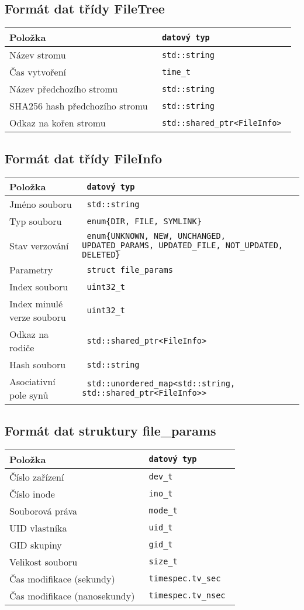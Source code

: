 \subsection{Formát dat třídy FileTree}

\begin{tabular}{l >{\tt}l}
\bf Položka & \bf datový typ \\
\hline
Název stromu & std::string \\
Čas vytvoření & time\_t \\
Název předchozího stromu & std::string \\
SHA256 hash předchozího stromu & std::string \\
Odkaz na kořen stromu & std::shared\_ptr<FileInfo> \\
\end{tabular}

\subsection{Formát dat třídy FileInfo}

\begin{tabular}{l >{\tt}p{7cm}}
\bf Položka & \bf datový typ \\
\hline
Jméno souboru & std::string \\
Typ souboru & enum\{DIR, FILE, SYMLINK\}\\
Stav verzování & enum\{UNKNOWN, NEW, UNCHANGED, UPDATED\_PARAMS, UPDATED\_FILE, NOT\_UPDATED, DELETED\} \\
Parametry & struct file\_params \\
Index souboru & uint32\_t \\
Index minulé verze souboru & uint32\_t \\
Odkaz na rodiče & std::shared\_ptr<FileInfo> \\
Hash souboru & std::string \\
Asociativní pole synů & std::unordered\_map<std::string, std::shared\_ptr<FileInfo>\relax> \\
\end{tabular}

\subsection{Formát dat struktury file\_params}

\begin{tabular}{l >{\tt}l}
\bf Položka & \bf datový typ \\
\hline
Číslo zařízení & dev\_t \\
Číslo inode & ino\_t \\
Souborová práva & mode\_t \\
UID vlastníka & uid\_t \\
GID skupiny & gid\_t \\
Velikost souboru & size\_t \\
Čas modifikace (sekundy) & timespec.tv\_sec \\
Čas modifikace (nanosekundy) & timespec.tv\_nsec \\
\end{tabular}

